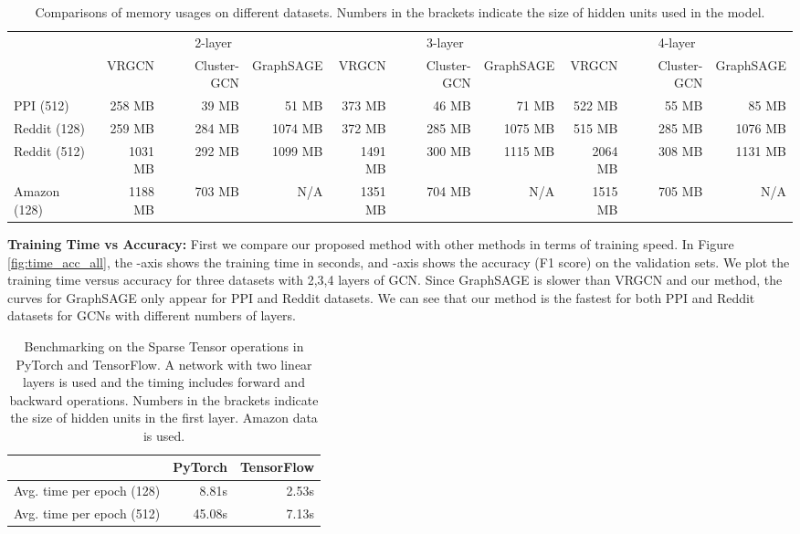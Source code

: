 \documentclass[sigconf]{acmart}
\begin{document}
\begin{table*}
\caption{Comparisons of memory usages on different datasets. Numbers in the brackets indicate the size of hidden units used in the model.}
\vspace{-10pt}\begin{tabular}{|l|r|r|r|r|r|r|r|r|r|}
\hline
 & \multicolumn{3}{c|}{2-layer} & \multicolumn{3}{c|}{3-layer} & \multicolumn{3}{c|}{4-layer} \\ \cline{2-10} 
& VRGCN & Cluster-GCN & GraphSAGE & VRGCN & Cluster-GCN & GraphSAGE & VRGCN & Cluster-GCN & GraphSAGE\\ \hline
PPI (512)    & 258 MB  & 39 MB  & 51 MB   & 373 MB & 46 MB  & 71 MB   & 522 MB & 55 MB  & 85 MB\\ \hline
Reddit (128) & 259 MB  & 284 MB & 1074 MB & 372 MB & 285 MB & 1075 MB & 515 MB & 285 MB & 1076 MB\\ \hline
Reddit (512) & 1031 MB & 292 MB & 1099 MB & 1491 MB & 300 MB & 1115 MB & 2064 MB & 308 MB & 1131 MB\\ \hline
Amazon (128) & 1188 MB & 703 MB & N/A & 1351 MB & 704 MB & N/A & 1515 MB & 705 MB & N/A \\ \hline
\end{tabular}
\label{tab:memory}
\end{table*}

{\bf Training Time vs Accuracy:} First we compare our proposed method with other methods in terms of training speed. In Figure \ref{fig:time_acc_all}, the -axis shows the training time in seconds, and -axis shows the accuracy (F1 score) on the validation sets. We plot the training time versus accuracy for three datasets with 2,3,4 layers of GCN. 
Since GraphSAGE is slower than VRGCN and our method, the curves for GraphSAGE only appear for PPI and Reddit datasets. We can see that our method is the fastest for both PPI and Reddit datasets for GCNs with different numbers of layers.

\begin{table}
\centering
      \caption{Benchmarking on the Sparse Tensor operations in PyTorch and TensorFlow. A network with two linear layers is used and the timing includes forward and backward operations. Numbers in the brackets indicate the size of hidden units in the first layer. Amazon data is used.}
      \label{tab:benchmark}
    \vspace{-10pt}\begin{tabular}{|l|r|r|}
    \hline
        & PyTorch & TensorFlow \\
     \hline
     Avg. time per epoch (128)  & 8.81s & 2.53s\\
     \hline
     Avg. time per epoch (512)  & 45.08s & 7.13s\\
    \hline
\end{tabular} 
\vspace{-10pt}
\end{table}
\end{document}
